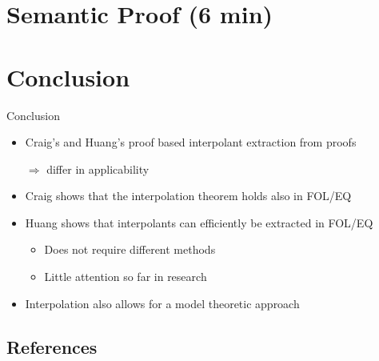 \documentclass[final,compress]{beamer}
\begin{document}
\section{Semantic Proof (6 min)}
\begin{frame}
\end{frame}

\section{Conclusion}
\begin{frame}{Conclusion}
	\begin{itemize}
		\item Craig's and Huang's proof based interpolant extraction from proofs

			$\Rightarrow$ differ in applicability 

		\item Craig shows that the interpolation theorem holds also in FOL/EQ
		\item Huang shows that interpolants can efficiently be extracted in FOL/EQ

			\begin{itemize}
				\item Does not require different methods
				\item Little attention so far in research
			\end{itemize}

		\item Interpolation also allows for a model theoretic approach

	\end{itemize}
\end{frame}

\subsection{References}
\begin{frame}
	  
\end{frame}
\end{document}
